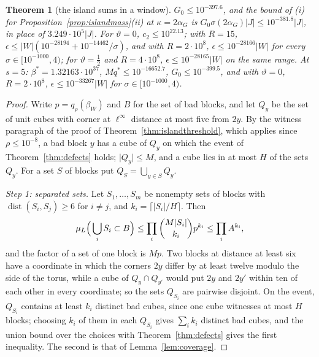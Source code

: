 \documentclass[11pt]{amsart}
\newtheorem{theorem}{Theorem}[section]
\theoremstyle{definition}
\theoremstyle{remark}
\numberwithin{equation}{section}
\newcommand{\dist}{\operatorname{dist}}
\begin{document}
\begin{theorem}[the island sums in a window]
$G_0\le10^{-397.6}$, and the bound of (i) for
Proposition~\ref{prop:islandmass}(ii) at $\kappa=2\alpha_G$ is
$G_0\sigma(2\alpha_G)\lvert J\rvert\le10^{-381.8}\lvert J\rvert$, in place of
$3.249\cdot10^5\lvert J\rvert$. For $\vartheta=0$, $c_2\le10^{22.13}$; with
$R=15$, $\epsilon\le\lvert W\rvert(10^{-28194}+10^{-14462}/\sigma)$, and
with $R=2\cdot10^8$, $\epsilon\le10^{-28166}\lvert W\rvert$ for every
$\sigma\in[10^{-1000},4)$; for $\vartheta=\frac12$ and $R=4\cdot10^8$,
$\epsilon\le10^{-28165}\lvert W\rvert$ on the same range. At $s=5$:
$\beta^*=1.32163\cdot10^{37}$, $Mq^*\le10^{-16652.7}$, $G_0\le
10^{-399.5}$, and with $\vartheta=0$, $R=2\cdot10^8$,
$\epsilon\le10^{-33267}\lvert W\rvert$ for $\sigma\in[10^{-1000},4)$.
\end{theorem}

\begin{proof}
Write $p=q_\rho(\beta_W)$ and $B$ for the set of bad blocks, and let $Q_y$
be the set of unit cubes with corner at $\ell^\infty$ distance at most five
from $2y$. By the witness paragraph of the proof of
Theorem~\ref{thm:islandthreshold}, which applies since $\rho\le10^{-8}$, a
bad block $y$ has a cube of $Q_y$ on which the event of
Theorem~\ref{thm:defects} holds; $\lvert Q_y\rvert\le M$, and a cube lies
in at most $H$ of the sets $Q_y$. For a set $S$ of blocks put
$Q_S=\bigcup_{y\in S}Q_y$.

\emph{Step 1: separated sets.} Let $S_1,\dots,S_m$ be nonempty sets of
blocks with $\dist(S_i,S_j)\ge6$ for $i\ne j$, and $k_i=\lceil\lvert S_i
\rvert/H\rceil$. Then
\[
\mu_L\Bigl(\,\bigcup_iS_i\subset B\Bigr)\le\prod_i\binom{M\lvert S_i\rvert}
{k_i}p^{k_i}\le\prod_iA^{k_i},
\]
and the factor of a set of one block is $Mp$. Two blocks at distance at
least six have a coordinate in which the corners $2y$ differ by at least
twelve modulo the side of the torus, while a cube of $Q_y\cap Q_{y'}$ would
put $2y$ and $2y'$ within ten of each other in every coordinate; so the sets
$Q_{S_i}$ are pairwise disjoint. On the event, $Q_{S_i}$ contains at least $k_i$ distinct bad
cubes, since one cube witnesses at most $H$ blocks; choosing $k_i$ of them
in each $Q_{S_i}$ gives $\sum_ik_i$ distinct bad cubes, and the union bound
over the choices with Theorem~\ref{thm:defects} gives the first
inequality. The second is that of Lemma~\ref{lem:coverage}.


\end{proof}
\end{document}

